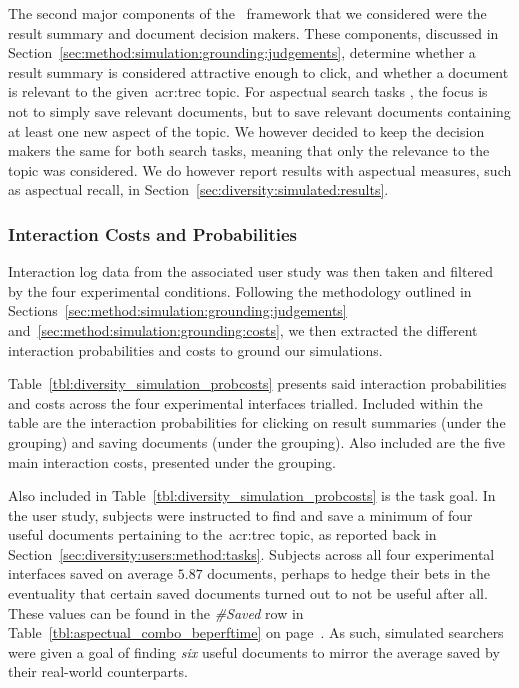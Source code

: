 The second major components of the \simiir~framework that we considered were the result summary and document decision makers. These components, discussed in Section~\ref{sec:method:simulation:grounding:judgements}, determine whether a result summary is considered attractive enough to click, and whether a document is relevant to the given~\gls{acr:trec} topic. For aspectual search tasks , the focus is not to simply save relevant documents, but to save relevant documents containing at least one new aspect of the topic. We however decided to keep the decision makers the same for both search tasks, meaning that only the relevance to the topic was considered. We do however report results with aspectual measures, such as aspectual recall, in Section~\ref{sec:diversity:simulated:results}.

\subsubsection{Interaction Costs and Probabilities}\label{sec:diversity:simulated:method:probscosts}
Interaction log data from the associated user study was then taken and filtered by the four experimental conditions. Following the methodology outlined in Sections~\ref{sec:method:simulation:grounding:judgements} and~\ref{sec:method:simulation:grounding:costs}, we then extracted the different interaction probabilities and costs to ground our simulations.

Table~\ref{tbl:diversity_simulation_probcosts} presents said interaction probabilities and costs across the four experimental interfaces trialled. Included within the table are the interaction probabilities for clicking on result summaries (under the  grouping) and saving documents (under the  grouping). Also included are the five main interaction costs, presented under the  grouping.

Also included in Table~\ref{tbl:diversity_simulation_probcosts} is the task goal. In the user study, subjects were instructed to find and save a minimum of four useful documents pertaining to the~\gls{acr:trec} topic, as reported back in Section~\ref{sec:diversity:users:method:tasks}. Subjects across all four experimental interfaces saved on average $5.87$ documents, perhaps to hedge their bets in the eventuality that certain saved documents turned out to not be useful after all. These values can be found in the \emph{\#Saved} row in Table~\ref{tbl:aspectual_combo_beperftime} on page~\pageref{tbl:aspectual_combo_beperftime}. As such, simulated searchers were given a goal of finding \emph{six} useful documents to mirror the average saved by their real-world counterparts.

